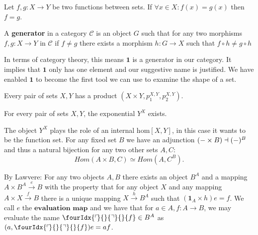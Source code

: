 \begin{axiom}
Let $f,g: X \longrightarrow Y$ be two functions between sets. If $\forall x \in X: f(x) = g(x)$ then $f = g$.
\end{axiom}

\begin{definition}
A \textbf{generator} in a category $\mathcal{C}$ is an object $G$ such that for any two morphisms $f,g: X \longrightarrow Y$ in $\mathcal{C}$ if $f \neq g$ there exists a morphism $h: G \longrightarrow X$ such that $f \circ h \neq g \circ h$
\end{definition}

\begin{remark}
In terms of category theory, this means $\mathbf{1}$ is a generator in our category. It implies that $\mathbf{1}$ only has one element and our suggestive name is justified. We have enabled $\mathbf{1}$ to become the first tool we can use to examine the shape of a set.
\end{remark}

\begin{axiom}
Every pair of sets $X, Y$ has a product $(X \times Y, p_1^{X,Y}, p_2^{X,Y})$.
\end{axiom}

\begin{axiom}
For every pair of sets $X, Y$, the exponential $Y^X$ exists.
\end{axiom}

\begin{remark}[$\dagger$]
The object $Y^X$ plays the role of an internal hom$[X,Y]$, in this case it wants to be the function set. For any fixed set $B$ we have an adjunction $(\-- \times B) \dashv (\--)^B$ and thus a natural bijection for any two other sets $A,C$:
\begin{equation*}
Hom(A \times B, C) \simeq Hom(A, C^B).
\end{equation*}

By Lawvere: For any two objects $A, B$ there exists an object $B^A$ and a mapping $A \times B^A \xrightarrow{e} B$ with the property that for any object $X$ and any mapping $A \times X\xrightarrow{f} B$ there is a unique mapping $X \xrightarrow{h} B^A$ such that $(\mathbf{1}_A \times h)e = f$. We call $e$ the $\textbf{evaluation map}$ and we have that for $a \in A, f:A\longrightarrow B$, we may evaluate the name $\fourIdx{\ulcorner\mkern-3mu}{}{\urcorner}{}{f} \in B^A$ as $(a,\fourIdx{\ulcorner\mkern-3mu}{}{\urcorner}{}{f})e = af$.

\end{remark}

